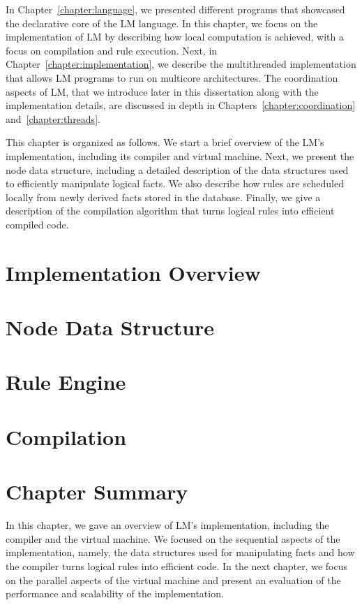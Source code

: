 
In Chapter~\ref{chapter:language}, we presented different programs that
showcased the declarative core of the LM language. In this chapter, we focus on
the implementation of LM by describing how local computation is achieved, with a
focus on compilation and rule execution.  Next, in
Chapter~\ref{chapter:implementation}, we describe the multithreaded
implementation that allows LM programs to run on multicore architectures. The
coordination aspects of LM, that we introduce later in this dissertation along
with the implementation details, are discussed in depth in
Chapters~\ref{chapter:coordination} and~\ref{chapter:threads}.

This chapter is organized as follows. We start a brief overview of the LM's
implementation, including its compiler and virtual machine. Next, we present the
node data structure, including a detailed description of the data structures
used to efficiently manipulate logical facts.  We also describe how rules are
scheduled locally from newly derived facts stored in the database.  Finally, we
give a description of the compilation algorithm that turns logical rules into
efficient compiled code.


\section{Implementation Overview}


\section{Node Data Structure}\label{sec:data_structures}


\section{Rule Engine}\label{section:local:rule_engine}\label{sec:implementation:rule_engine}


\section{Compilation}


\section{Chapter Summary}

In this chapter, we gave an overview of LM's implementation, including the
compiler and the virtual machine. We focused on the sequential aspects of the
implementation, namely, the data structures used for manipulating facts and how
the compiler turns logical rules into efficient code. In the next chapter, we
focus on the parallel aspects of the virtual machine and present an evaluation
of the performance and scalability of the implementation.

